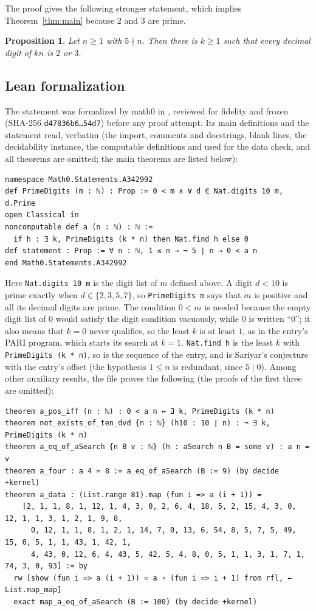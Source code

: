 \documentclass[11pt]{amsart}
\theoremstyle{plain}
\newtheorem{proposition}[theorem]{Proposition}
\theoremstyle{definition}
\begin{document}
The proof gives the following stronger statement, which implies Theorem~\ref{thm:main} because $2$ and $3$ are prime.

\begin{proposition}\label{prop:23}
Let $n\ge1$ with $5\nmid n$. Then there is $k\ge1$ such that every decimal digit of $kn$ is $2$ or $3$.
\end{proposition}

\subsection*{Lean formalization}
The statement was formalized by math0 in , reviewed for fidelity and frozen (SHA-256 \texttt{d47836b6\ldots 54d7}) before any proof attempt. Its main definitions and the statement read, verbatim (the import, comments and docstrings, blank lines, the decidability instance, the computable definitions  and  used for the data check, and all theorems are omitted; the main theorems are listed below):
\begin{lstlisting}
namespace Math0.Statements.A342992
def PrimeDigits (m : ℕ) : Prop := 0 < m ∧ ∀ d ∈ Nat.digits 10 m, d.Prime
open Classical in
noncomputable def a (n : ℕ) : ℕ :=
  if h : ∃ k, PrimeDigits (k * n) then Nat.find h else 0
def statement : Prop := ∀ n : ℕ, 1 ≤ n → ¬ 5 ∣ n → 0 < a n
end Math0.Statements.A342992
\end{lstlisting}
Here \texttt{Nat.digits 10 m} is the digit list of $m$ defined above. A digit $d<10$ is prime exactly when $d\in\{2,3,5,7\}$, so \texttt{PrimeDigits m} says that $m$ is positive and all its decimal digits are prime. The condition $0<m$ is needed because the empty digit list of $0$ would satisfy the digit condition vacuously, while $0$ is written ``0''; it also means that $k=0$ never qualifies, so the least $k$ is at least $1$, as in the entry's PARI program, which starts its search at $k=1$. \texttt{Nat.find h} is the least $k$ with \texttt{PrimeDigits (k * n)}, so  is the sequence of the entry, and  is Sariyar's conjecture with the entry's offset (the hypothesis $1\le n$ is redundant, since $5\mid0$). Among other auxiliary results, the file proves the following (the proofs of the first three are omitted):
\begin{lstlisting}[basicstyle=\ttfamily\scriptsize]
theorem a_pos_iff (n : ℕ) : 0 < a n ↔ ∃ k, PrimeDigits (k * n)
theorem not_exists_of_ten_dvd {n : ℕ} (h10 : 10 ∣ n) : ¬ ∃ k, PrimeDigits (k * n)
theorem a_eq_of_aSearch {n B v : ℕ} (h : aSearch n B = some v) : a n = v
theorem a_four : a 4 = 8 := a_eq_of_aSearch (B := 9) (by decide +kernel)
theorem a_data : (List.range 81).map (fun i => a (i + 1)) =
    [2, 1, 1, 8, 1, 12, 1, 4, 3, 0, 2, 6, 4, 18, 5, 2, 15, 4, 3, 0, 12, 1, 1, 3, 1, 2, 1, 9, 8,
      0, 12, 1, 1, 8, 1, 2, 1, 14, 7, 0, 13, 6, 54, 8, 5, 7, 5, 49, 15, 0, 5, 1, 1, 43, 1, 42, 1,
      4, 43, 0, 12, 6, 4, 43, 5, 42, 5, 4, 8, 0, 5, 1, 1, 3, 1, 7, 1, 74, 3, 0, 93] := by
  rw [show (fun i => a (i + 1)) = a ∘ (fun i => i + 1) from rfl, ← List.map_map]
  exact map_a_eq_of_aSearch (B := 100) (by decide +kernel)
\end{lstlisting}
\end{document}
